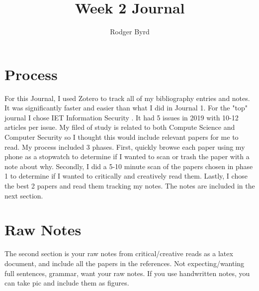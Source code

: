 \documentclass[conference]{IEEEtran}
\begin{document}

\title{Week 2 Journal}
\author{Rodger Byrd}
\maketitle


\section{Process}

For this Journal, I used Zotero to track all of my bibliography entries and notes. It was significantly faster and easier than what I did in Journal 1. 
For the "top" journal I chose IET Information Security \cite{noauthor_iet_nodate}. It had 5 issues in 2019 with 10-12 articles per issue. My filed of study is related to both Compute Science and Computer Security so I thought this would include relevant papers for me to read. My process included 3 phases. 
First, quickly browse each paper using my phone as a stopwatch to determine if I wanted to scan or trash the paper with a note about why.
Secondly, I did a 5-10 minute scan of the papers chosen in phase 1 to determine if I wanted to critically and creatively read them.
Lastly, I chose the best 2 papers and read them tracking my notes. The notes are included in the next section.

\section{Raw Notes}
The second section is your raw notes from critical/creative reads as a latex document, and include all the papers in the references. Not expecting/wanting full sentences, grammar, want your raw notes.  If you use handwritten notes, you can take pic and include them as figures. 





\end{document}
